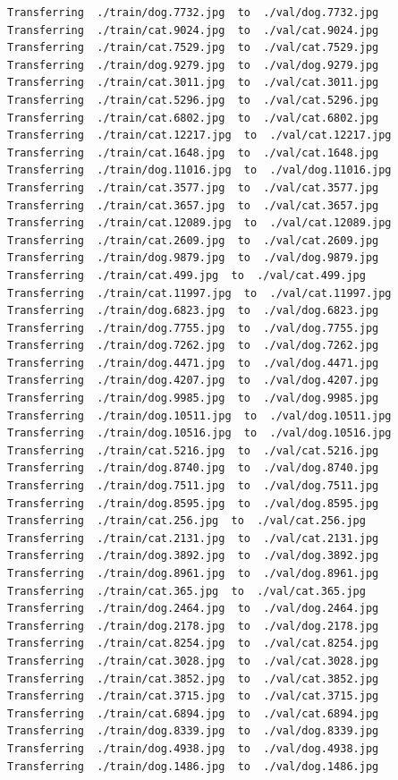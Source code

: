 \documentclass[]{book}
\theoremstyle{definition}
\theoremstyle{definition}
\theoremstyle{definition}
\theoremstyle{remark}
\begin{document}
\begin{verbatim}
Transferring  ./train/dog.7732.jpg  to  ./val/dog.7732.jpg
Transferring  ./train/cat.9024.jpg  to  ./val/cat.9024.jpg
Transferring  ./train/cat.7529.jpg  to  ./val/cat.7529.jpg
Transferring  ./train/dog.9279.jpg  to  ./val/dog.9279.jpg
Transferring  ./train/cat.3011.jpg  to  ./val/cat.3011.jpg
Transferring  ./train/cat.5296.jpg  to  ./val/cat.5296.jpg
Transferring  ./train/cat.6802.jpg  to  ./val/cat.6802.jpg
Transferring  ./train/cat.12217.jpg  to  ./val/cat.12217.jpg
Transferring  ./train/cat.1648.jpg  to  ./val/cat.1648.jpg
Transferring  ./train/dog.11016.jpg  to  ./val/dog.11016.jpg
Transferring  ./train/cat.3577.jpg  to  ./val/cat.3577.jpg
Transferring  ./train/cat.3657.jpg  to  ./val/cat.3657.jpg
Transferring  ./train/cat.12089.jpg  to  ./val/cat.12089.jpg
Transferring  ./train/cat.2609.jpg  to  ./val/cat.2609.jpg
Transferring  ./train/dog.9879.jpg  to  ./val/dog.9879.jpg
Transferring  ./train/cat.499.jpg  to  ./val/cat.499.jpg
Transferring  ./train/cat.11997.jpg  to  ./val/cat.11997.jpg
Transferring  ./train/dog.6823.jpg  to  ./val/dog.6823.jpg
Transferring  ./train/dog.7755.jpg  to  ./val/dog.7755.jpg
Transferring  ./train/dog.7262.jpg  to  ./val/dog.7262.jpg
Transferring  ./train/dog.4471.jpg  to  ./val/dog.4471.jpg
Transferring  ./train/dog.4207.jpg  to  ./val/dog.4207.jpg
Transferring  ./train/dog.9985.jpg  to  ./val/dog.9985.jpg
Transferring  ./train/dog.10511.jpg  to  ./val/dog.10511.jpg
Transferring  ./train/dog.10516.jpg  to  ./val/dog.10516.jpg
Transferring  ./train/cat.5216.jpg  to  ./val/cat.5216.jpg
Transferring  ./train/dog.8740.jpg  to  ./val/dog.8740.jpg
Transferring  ./train/dog.7511.jpg  to  ./val/dog.7511.jpg
Transferring  ./train/dog.8595.jpg  to  ./val/dog.8595.jpg
Transferring  ./train/cat.256.jpg  to  ./val/cat.256.jpg
Transferring  ./train/cat.2131.jpg  to  ./val/cat.2131.jpg
Transferring  ./train/dog.3892.jpg  to  ./val/dog.3892.jpg
Transferring  ./train/dog.8961.jpg  to  ./val/dog.8961.jpg
Transferring  ./train/cat.365.jpg  to  ./val/cat.365.jpg
Transferring  ./train/dog.2464.jpg  to  ./val/dog.2464.jpg
Transferring  ./train/dog.2178.jpg  to  ./val/dog.2178.jpg
Transferring  ./train/cat.8254.jpg  to  ./val/cat.8254.jpg
Transferring  ./train/cat.3028.jpg  to  ./val/cat.3028.jpg
Transferring  ./train/cat.3852.jpg  to  ./val/cat.3852.jpg
Transferring  ./train/cat.3715.jpg  to  ./val/cat.3715.jpg
Transferring  ./train/cat.6894.jpg  to  ./val/cat.6894.jpg
Transferring  ./train/dog.8339.jpg  to  ./val/dog.8339.jpg
Transferring  ./train/dog.4938.jpg  to  ./val/dog.4938.jpg
Transferring  ./train/dog.1486.jpg  to  ./val/dog.1486.jpg

\end{verbatim}
\end{document}
